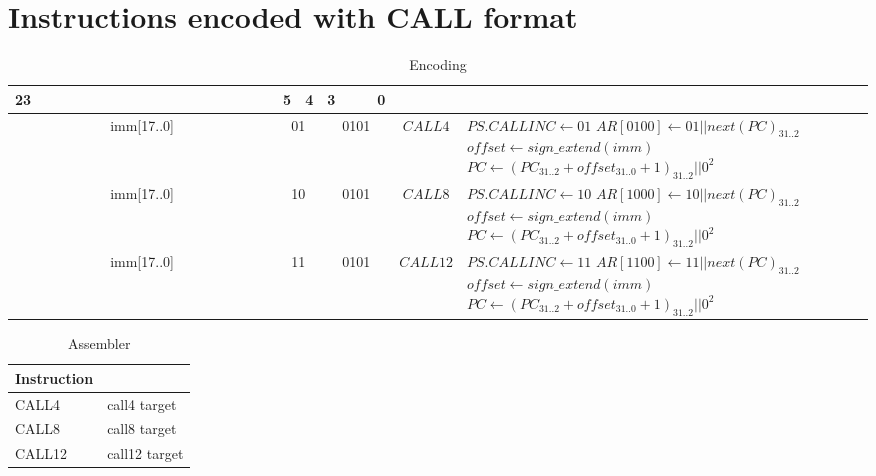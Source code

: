 \section*{Instructions encoded with CALL format}
\begin{longtable}{llllllllllllllllllllllll  p{1cm}  p{7cm} | }
	\caption{Encoding\label{long}}\\
	23 & & & & & & & & & & & & & & & & & & 5 & 4 & 3 & & & 0 & &
	\multicolumn{1}{c}{}\\
	\hline
	\multicolumn{18}{|c|}{imm[17..0]} & \multicolumn{2}{c|}{01} & \multicolumn{4}{c|}{0101} & \multicolumn{1}{c|}{$CALL4$} & $PS.CALLINC \leftarrow {01}$ \newline $AR[0100] \leftarrow 01||next(PC)_{31..2}$ \newline $offset \leftarrow sign\_extend(imm)$ \newline $PC \leftarrow (PC_{31..2}+offset_{31..0}+1)_{31..2}||0^2$\\ \hline
	\multicolumn{18}{|c|}{imm[17..0]} & \multicolumn{2}{c|}{10} & \multicolumn{4}{c|}{0101} & \multicolumn{1}{c|}{$CALL8$} &$PS.CALLINC \leftarrow {10}$ \newline $AR[1000] \leftarrow 10||next(PC)_{31..2}$ \newline $offset \leftarrow sign\_extend(imm)$ \newline $PC \leftarrow (PC_{31..2}+offset_{31..0}+1)_{31..2}||0^2$\\ \hline
	\multicolumn{18}{|c|}{imm[17..0]} & \multicolumn{2}{c|}{11} & \multicolumn{4}{c|}{0101} & \multicolumn{1}{c|}{$CALL12$} & $PS.CALLINC \leftarrow {11}$ \newline $AR[1100] \leftarrow 11||next(PC)_{31..2}$ \newline $offset \leftarrow sign\_extend(imm)$ \newline $PC \leftarrow (PC_{31..2}+offset_{31..0}+1)_{31..2}||0^2$\\ \hline
\end{longtable}

\begin{longtable}{|p{5cm}|p{5cm}|}
	\caption{Assembler\label{long}}\\
	\hline
	Instruction & \\
	\hline
	CALL4 & call4 target\\ \hline
	CALL8 & call8 target\\ \hline
	CALL12 & call12 target\\ \hline
\end{longtable}


